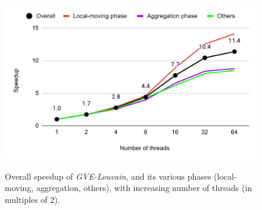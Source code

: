 \begin{figure}[hbtp]
  \centering
  \includegraphics[width=0.98\linewidth]{out/louvain-ss.pdf} \\[-2ex]
  \caption{Overall speedup of \textit{GVE-Louvain}, and its various phases (local-moving, aggregation, others), with increasing number of threads (in multiples of 2).}
  \label{fig:louvain-ss}
\end{figure}
